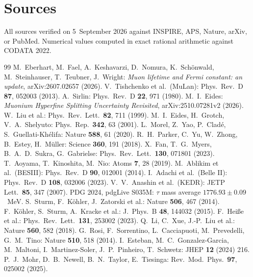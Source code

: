 \section*{Sources}

All sources verified on 5~September 2026 against INSPIRE, APS, Nature, arXiv, or PubMed. Numerical values computed in exact rational arithmetic against CODATA 2022.

\begin{thebibliography}{99}\small
{} M.~Eberhart, M.~Fael, A.~Keshavarzi, D.~Nomura, K.~Schönwald, M.~Steinhauser, T.~Teubner, J.~Wright: \emph{Muon lifetime and Fermi constant: an update}, arXiv:2607.02657 (2026).
 V.~Tishchenko et al.\ (MuLan): Phys.\ Rev.\ D \textbf{87}, 052003 (2013).
 A.~Sirlin: Phys.\ Rev.\ D \textbf{22}, 971 (1980).
 M.~I.~Eides: \emph{Muonium Hyperfine Splitting Uncertainty Revisited}, arXiv:2510.07281v2 (2026).
 W.~Liu et al.: Phys.\ Rev.\ Lett.\ \textbf{82}, 711 (1999).
 M.~I.~Eides, H.~Grotch, V.~A.~Shelyuto: Phys.\ Rep.\ \textbf{342}, 63 (2001).
 L.~Morel, Z.~Yao, P.~Cladé, S.~Guellati-Khélifa: Nature \textbf{588}, 61 (2020).
 R.~H.~Parker, C.~Yu, W.~Zhong, B.~Estey, H.~Müller: Science \textbf{360}, 191 (2018).
 X.~Fan, T.~G.~Myers, B.~A.~D.~Sukra, G.~Gabrielse: Phys.\ Rev.\ Lett.\ \textbf{130}, 071801 (2023).
 T.~Aoyama, T.~Kinoshita, M.~Nio: Atoms \textbf{7}, 28 (2019).
 M.~Ablikim et al.\ (BESIII): Phys.\ Rev.\ D \textbf{90}, 012001 (2014).
 I.~Adachi et al.\ (Belle II): Phys.\ Rev.\ D \textbf{108}, 032006 (2023).
 V.~V.~Anashin et al.\ (KEDR): JETP Lett.\ \textbf{85}, 347 (2007).
 PDG 2024, pdgLive S035M: $\tau$ mass average $1776.93\pm0.09$~MeV.
 S.~Sturm, F.~Köhler, J.~Zatorski et al.: Nature \textbf{506}, 467 (2014).
 F.~Köhler, S.~Sturm, A.~Kracke et al.: J.\ Phys.\ B \textbf{48}, 144032 (2015).
 F.~Heiße et al.: Phys.\ Rev.\ Lett.\ \textbf{131}, 253002 (2023).
 Q.~Li, C.~Xue, J.-P.~Liu et al.: Nature \textbf{560}, 582 (2018).
 G.~Rosi, F.~Sorrentino, L.~Cacciapuoti, M.~Prevedelli, G.~M.~Tino: Nature \textbf{510}, 518 (2014).
 I.~Esteban, M.~C.~Gonzalez-Garcia, M.~Maltoni, I.~Martinez-Soler, J.~P.~Pinheiro, T.~Schwetz: JHEP \textbf{12} (2024) 216.
 P.~J.~Mohr, D.~B.~Newell, B.~N.~Taylor, E.~Tiesinga: Rev.\ Mod.\ Phys.\ \textbf{97}, 025002 (2025).
\end{thebibliography}

